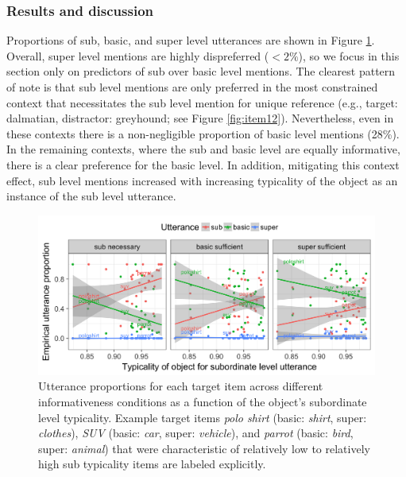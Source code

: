 \documentclass[11pt]{article}
\newcommand{\figref}[1]{Figure \ref{#1}}
\begin{document}
\subsubsection{Results and discussion}


Proportions of sub, basic, and super level utterances are shown in \figref{fig:exp2results}. Overall, super level mentions are highly dispreferred ($< 2\%$), so we focus in this section only on predictors of sub over basic level mentions. The clearest pattern of note is that sub level mentions are only preferred in the most constrained context that necessitates the sub level mention for unique reference (e.g., target: dalmatian, distractor: greyhound; see \figref{fig:item12}). Nevertheless, even in these contexts there is a non-negligible proportion of basic level mentions (28\%). In the remaining contexts, where the sub and basic level are equally informative, there is a clear preference for the basic level. In addition, mitigating this context effect, sub level mentions increased with increasing typicality of the object as an instance of the sub level utterance.


\begin{figure}
\centering
\includegraphics[width=.9\textwidth]{pics/results-exp3.png}
\caption{Utterance proportions for each target item across different informativeness conditions as a function of the object's subordinate level typicality. Example target items \emph{polo shirt} (basic: \emph{shirt}, super: \emph{clothes}),  \emph{SUV} (basic: \emph{car}, super: \emph{vehicle}), and \emph{parrot} (basic: \emph{bird}, super: \emph{animal}) that were characteristic of relatively low to relatively high sub typicality items are labeled explicitly.}
\label{fig:exp2results}
\end{figure}
\end{document}
